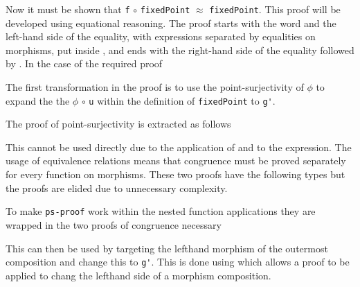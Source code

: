
Now it must be shown that \verb|f| $\circ$ \verb|fixedPoint| $\approx$
\verb|fixedPoint|. This proof will be developed using equational reasoning. The
proof starts with the word  and the left-hand side of the
equality, with expressions separated by
equalities on morphisms, put inside
\AgdaSpace{}, and
ends with the right-hand side of the equality followed by
. In the case of the required proof


The first transformation in the proof is to use the point-surjectivity of
$\phi$ to expand the the $\phi$ $\circ$ \verb|u| within the definition of
\verb|fixedPoint| to \verb|g'|.

The proof of point-surjectivity is extracted as follows


This cannot be used directly due to the application of  and
 to the expression. The usage of equivalence relations
means that congruence must be proved separately for every function on
morphisms. These two proofs have the following types but the proofs are elided
due to unnecessary complexity.

\begin{AgdaSuppressSpace}
\end{AgdaSuppressSpace}

To make \verb|ps-proof| work within the nested function applications they are
wrapped in the two proofs of congruence necessary


This can then be used by targeting the lefthand morphism of the outermost
composition and change this to \verb|g'|. This is done using
 which allows a proof to be applied to chang the lefthand
side of a morphism composition.

